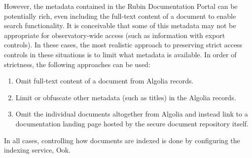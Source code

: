 However, the metadata contained in the Rubin Documentation Portal can be potentially rich, even including the full-text content of a document to enable search functionality.
It is conceivable that some of this metadata may not be appropriate for observatory-wide access (such as information with export controls).
In these cases, the most realistic approach to preserving strict access controls in these situations is to limit what metadata is available.
In order of strictness, the following approaches can be used:

\begin{enumerate}
  \item Omit full-text content of a document from Algolia records.
  \item Limit or obfuscate other metadata (such as titles) in the Algolia records.
  \item Omit the individual documents altogether from Algolia and instead link to a documentation landing page hosted by the secure document repository itself.
\end{enumerate}

In all cases, controlling how documents are indexed is done by configuring the indexing service, Ook.
